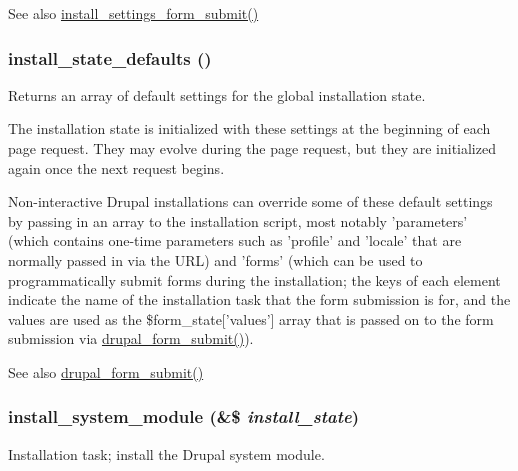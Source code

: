 \begin{DoxySeeAlso}{See also}
\hyperlink{install_8core_8inc_abe061599cf0c6252388fc93366ebae27}{install\_\-settings\_\-form\_\-submit()} 
\end{DoxySeeAlso}
\hypertarget{install_8core_8inc_ab52bef71652d133045e4182da84a33b8}{
\subsubsection[{install\_\-state\_\-defaults}]{\setlength{\rightskip}{0pt plus 5cm}install\_\-state\_\-defaults ()}}
\label{install_8core_8inc_ab52bef71652d133045e4182da84a33b8}
Returns an array of default settings for the global installation state.

The installation state is initialized with these settings at the beginning of each page request. They may evolve during the page request, but they are initialized again once the next request begins.

Non-\/interactive Drupal installations can override some of these default settings by passing in an array to the installation script, most notably 'parameters' (which contains one-\/time parameters such as 'profile' and 'locale' that are normally passed in via the URL) and 'forms' (which can be used to programmatically submit forms during the installation; the keys of each element indicate the name of the installation task that the form submission is for, and the values are used as the \$form\_\-state\mbox{[}'values'\mbox{]} array that is passed on to the form submission via \hyperlink{group__form__api_ga4312d7fe0602f6359153fc62cba1ca24}{drupal\_\-form\_\-submit()}).

\begin{DoxySeeAlso}{See also}
\hyperlink{group__form__api_ga4312d7fe0602f6359153fc62cba1ca24}{drupal\_\-form\_\-submit()} 
\end{DoxySeeAlso}
\hypertarget{install_8core_8inc_a8aa087a6aedfb74d1ad361f2269dbd06}{
\subsubsection[{install\_\-system\_\-module}]{\setlength{\rightskip}{0pt plus 5cm}install\_\-system\_\-module (\&\$ {\em install\_\-state})}}
\label{install_8core_8inc_a8aa087a6aedfb74d1ad361f2269dbd06}
Installation task; install the Drupal system module.


